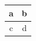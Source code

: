 \documentclass{article}
\begin{document}
\begin{tabular}{cc} a & b\\ \hline c & d \end{tabular}
\end{document}
